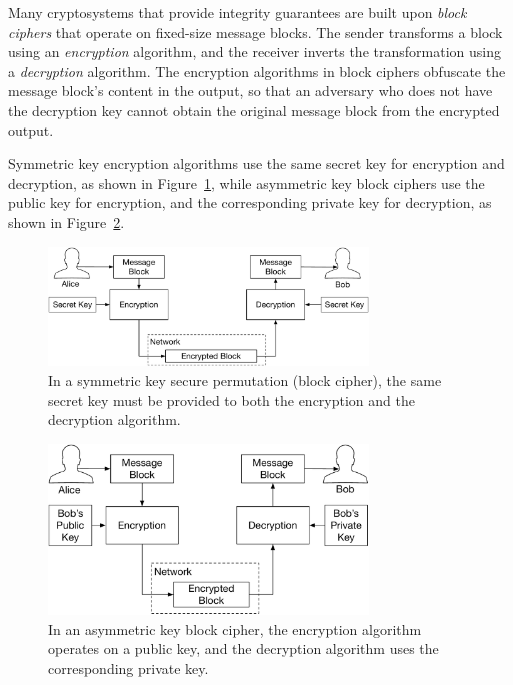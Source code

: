 \label{sec:privacy_crypto}

Many cryptosystems that provide integrity guarantees are built upon
\textit{block ciphers} that operate on fixed-size message blocks. The sender
transforms a block using an \textit{encryption} algorithm, and the receiver
inverts the transformation using a \textit{decryption} algorithm. The
encryption algorithms in block ciphers obfuscate the message block's content in
the output, so that an adversary who does not have the decryption key cannot
obtain the original message block from the encrypted output.

Symmetric key encryption algorithms use the same secret key for encryption and
decryption, as shown in Figure~\ref{fig:symmetric_block_cipher}, while
asymmetric key block ciphers use the public key for encryption, and the
corresponding private key for decryption, as shown in
Figure~\ref{fig:asymmetric_block_cipher}.
\begin{figure}[hbt]
  \centering
  \includegraphics[width=85mm]{figures/symmetric_block_cipher.pdf}
  \caption{
    In a symmetric key secure permutation (block cipher), the same secret key
    must be provided to both the encryption and the decryption algorithm.
  }
  \label{fig:symmetric_block_cipher}
\end{figure}

\begin{figure}[hbt]
  \centering
  \includegraphics[width=85mm]{figures/asymmetric_block_cipher.pdf}
  \caption{
    In an asymmetric key block cipher, the encryption algorithm operates on a
    public key, and the decryption algorithm uses the corresponding private
    key.
  }
  \label{fig:asymmetric_block_cipher}
\end{figure}

